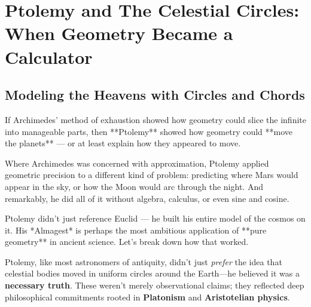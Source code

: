 \section{Ptolemy and The Celestial Circles: When Geometry Became a Calculator}

\subsection{Modeling the Heavens with Circles and Chords}

If Archimedes’ method of exhaustion showed how geometry could slice the infinite into manageable parts, then **Ptolemy** showed how geometry could **move the planets** — or at least explain how they appeared to move.

Where Archimedes was concerned with approximation, Ptolemy applied geometric precision to a different kind of problem: predicting where Mars would appear in the sky, or how the Moon would arc through the night. And remarkably, he did all of it without algebra, calculus, or even sine and cosine.

Ptolemy didn’t just reference Euclid — he built his entire model of the cosmos on it. His *Almagest* is perhaps the most ambitious application of **pure geometry** in ancient science. Let’s break down how that worked.

Ptolemy, like most astronomers of antiquity, didn’t just \emph{prefer} the idea that celestial bodies moved in uniform circles around the Earth—he believed it was a \textbf{necessary truth}. These weren’t merely observational claims; they reflected deep philosophical commitments rooted in \textbf{Platonism} and \textbf{Aristotelian physics}.

